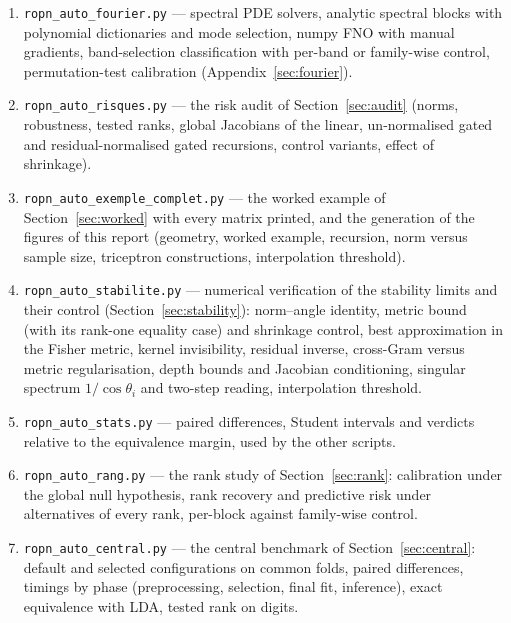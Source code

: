 \documentclass[11pt,a4paper]{article}
\theoremstyle{plain}
\theoremstyle{definition}
\theoremstyle{remark}
\begin{document}
\begin{enumerate}
  Karcher mean, tangent space, MDM), congruence-invariance check, covariance
  vs mean regimes, session change (Appendix~\ref{sec:riemann}).
  \item \texttt{ropn\_auto\_fourier.py} --- spectral PDE solvers, analytic
  spectral blocks with polynomial dictionaries and mode selection, numpy FNO
  with manual gradients, band-selection classification with per-band or
  family-wise control, permutation-test calibration
  (Appendix~\ref{sec:fourier}).
  \item \texttt{ropn\_auto\_risques.py} --- the risk audit of
  Section~\ref{sec:audit} (norms, robustness, tested ranks, global Jacobians
  of the linear, un-normalised gated and residual-normalised gated
  recursions, control variants, effect of shrinkage).
  \item \texttt{ropn\_auto\_exemple\_complet.py} --- the worked example of
  Section~\ref{sec:worked} with every matrix printed, and the generation of
  the figures of this report (geometry, worked example, recursion, norm
  versus sample size, triceptron constructions, interpolation threshold).
  \item \texttt{ropn\_auto\_stabilite.py} --- numerical verification of the
  stability limits and their control (Section~\ref{sec:stability}): norm--angle
  identity, metric bound (with its rank-one equality case) and shrinkage control, best approximation in the
  Fisher metric, kernel invisibility, residual inverse, cross-Gram versus
  metric regularisation, depth bounds and Jacobian conditioning, singular
  spectrum $1/\cos\theta_i$ and two-step reading, interpolation threshold.
  \item \texttt{ropn\_auto\_stats.py} --- paired differences, Student
  intervals and verdicts relative to the equivalence margin, used by the
  other scripts.
  \item \texttt{ropn\_auto\_rang.py} --- the rank study of
  Section~\ref{sec:rank}: calibration under the global null hypothesis,
  rank recovery and predictive risk under alternatives of every rank,
  per-block against family-wise control.
  \item \texttt{ropn\_auto\_central.py} --- the central benchmark of
  Section~\ref{sec:central}: default and selected configurations on common
  folds, paired differences, timings by phase (preprocessing, selection,
  final fit, inference), exact equivalence with LDA, tested rank on digits.
\end{enumerate}
\end{document}
